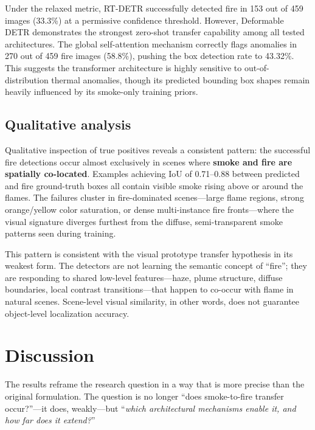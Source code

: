 \documentclass[10pt,twocolumn]{article}
\begin{document}
Under the relaxed metric, RT-DETR successfully detected fire in 153 out of 459 images (33.3\%) at a permissive confidence threshold. However, Deformable DETR demonstrates the strongest zero-shot transfer capability among all tested architectures. The global self-attention mechanism correctly flags anomalies in 270 out of 459 fire images (58.8\%), pushing the box detection rate to 43.32\%. This suggests the transformer architecture is highly sensitive to out-of-distribution thermal anomalies, though its predicted bounding box shapes remain heavily influenced by its smoke-only training priors.

\subsection{Qualitative analysis}

Qualitative inspection of true positives reveals a consistent pattern: the successful fire detections occur almost exclusively in scenes where \textbf{smoke and fire are spatially co-located}. Examples achieving IoU of 0.71--0.88 between predicted and fire ground-truth boxes all contain visible smoke rising above or around the flames. The failures cluster in fire-dominated scenes---large flame regions, strong orange/yellow color saturation, or dense multi-instance fire fronts---where the visual signature diverges furthest from the diffuse, semi-transparent smoke patterns seen during training.

This pattern is consistent with the visual prototype transfer hypothesis in its weakest form. The detectors are not learning the semantic concept of ``fire''; they are responding to shared low-level features---haze, plume structure, diffuse boundaries, local contrast transitions---that happen to co-occur with flame in natural scenes. Scene-level visual similarity, in other words, does not guarantee object-level localization accuracy.

\section{Discussion}

The results reframe the research question in a way that is more precise than the original formulation. The question is no longer ``does smoke-to-fire transfer occur?''---it does, weakly---but ``\emph{which architectural mechanisms enable it, and how far does it extend?}''
\end{document}
